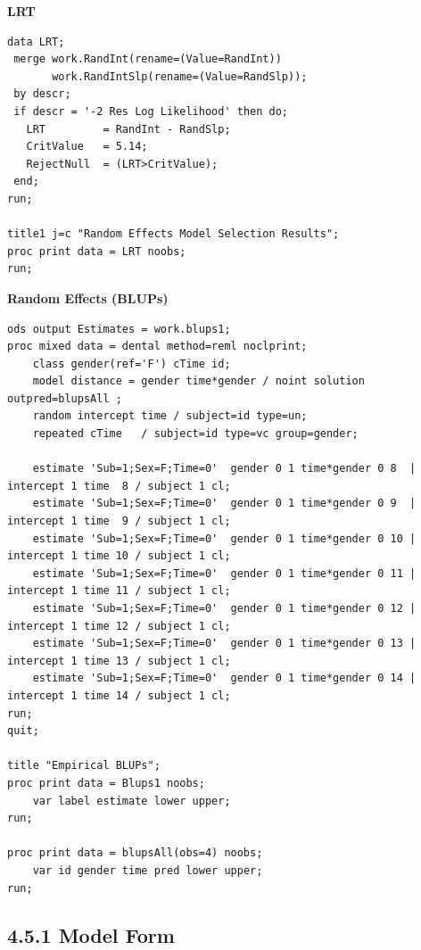 \documentclass[11pt]{article}
\begin{document}
\textbf{LRT}
\begin{lstlisting}[style=SASstyle]
data LRT;
 merge work.RandInt(rename=(Value=RandInt))
	   work.RandIntSlp(rename=(Value=RandSlp));
 by descr;
 if descr = '-2 Res Log Likelihood' then do;
   LRT         = RandInt - RandSlp;
   CritValue   = 5.14;
   RejectNull  = (LRT>CritValue);
 end;
run;

title1 j=c "Random Effects Model Selection Results";
proc print data = LRT noobs; 
run;
\end{lstlisting}

\textbf{Random Effects (BLUPs)}
\begin{lstlisting}[style=SASstyle]
ods output Estimates = work.blups1;
proc mixed data = dental method=reml noclprint;
	class gender(ref='F') cTime id;
	model distance = gender time*gender / noint solution outpred=blupsAll ;
	random intercept time / subject=id type=un;
	repeated cTime   / subject=id type=vc group=gender;

	estimate 'Sub=1;Sex=F;Time=0'  gender 0 1 time*gender 0 8  | intercept 1 time  8 / subject 1 cl;
	estimate 'Sub=1;Sex=F;Time=0'  gender 0 1 time*gender 0 9  | intercept 1 time  9 / subject 1 cl;
	estimate 'Sub=1;Sex=F;Time=0'  gender 0 1 time*gender 0 10 | intercept 1 time 10 / subject 1 cl;
	estimate 'Sub=1;Sex=F;Time=0'  gender 0 1 time*gender 0 11 | intercept 1 time 11 / subject 1 cl;
	estimate 'Sub=1;Sex=F;Time=0'  gender 0 1 time*gender 0 12 | intercept 1 time 12 / subject 1 cl;
	estimate 'Sub=1;Sex=F;Time=0'  gender 0 1 time*gender 0 13 | intercept 1 time 13 / subject 1 cl;
	estimate 'Sub=1;Sex=F;Time=0'  gender 0 1 time*gender 0 14 | intercept 1 time 14 / subject 1 cl;
run;
quit;

title "Empirical BLUPs";
proc print data = Blups1 noobs;
	var label estimate lower upper;
run;

proc print data = blupsAll(obs=4) noobs;
	var id gender time pred lower upper;
run;
\end{lstlisting}


\newpage

\begin{tcolorbox}[modelbox, title={Model 5: Marginal Model (GEE)}]
\end{tcolorbox}

\subsection*{4.5.1 Model Form}
\end{document}

